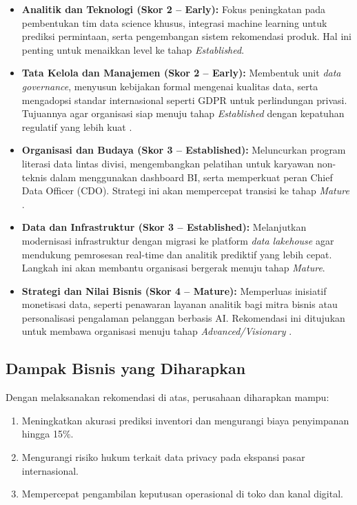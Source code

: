 \begin{itemize}
	\item \textbf{Analitik dan Teknologi (Skor 2 – Early):}  
	Fokus peningkatan pada pembentukan tim data science khusus, 
	integrasi machine learning untuk prediksi permintaan, serta 
	pengembangan sistem rekomendasi produk.  
	Hal ini penting untuk menaikkan level ke tahap \textit{Established}.
	
	\item \textbf{Tata Kelola dan Manajemen (Skor 2 – Early):}  
	Membentuk unit \textit{data governance}, menyusun kebijakan formal mengenai 
	kualitas data, serta mengadopsi standar internasional seperti GDPR untuk 
	perlindungan privasi.  
	Tujuannya agar organisasi siap menuju tahap \textit{Established} dengan 
	kepatuhan regulatif yang lebih kuat \cite{zwitter2014}.
	
	\item \textbf{Organisasi dan Budaya (Skor 3 – Established):}  
	Meluncurkan program literasi data lintas divisi, mengembangkan pelatihan 
	untuk karyawan non-teknis dalam menggunakan dashboard BI, serta memperkuat 
	peran Chief Data Officer (CDO).  
	Strategi ini akan mempercepat transisi ke tahap \textit{Mature} 
	\cite{davenport2010analytics}.
	
	\item \textbf{Data dan Infrastruktur (Skor 3 – Established):}  
	Melanjutkan modernisasi infrastruktur dengan migrasi ke platform 
	\textit{data lakehouse} agar mendukung pemrosesan real-time dan 
	analitik prediktif yang lebih cepat.  
	Langkah ini akan membantu organisasi bergerak menuju tahap \textit{Mature}.
	
	\item \textbf{Strategi dan Nilai Bisnis (Skor 4 – Mature):}  
	Memperluas inisiatif monetisasi data, seperti penawaran layanan analitik 
	bagi mitra bisnis atau personalisasi pengalaman pelanggan berbasis AI.  
	Rekomendasi ini ditujukan untuk membawa organisasi menuju tahap 
	\textit{Advanced/Visionary} \cite{liao2021business, ekambaram2021}.
\end{itemize}


\subsection*{Dampak Bisnis yang Diharapkan}
Dengan melaksanakan rekomendasi di atas, perusahaan diharapkan mampu:
\begin{enumerate}
	\item Meningkatkan akurasi prediksi inventori dan mengurangi biaya penyimpanan hingga 15\%.  
	\item Mengurangi risiko hukum terkait data privacy pada ekspansi pasar internasional.  
	\item Mempercepat pengambilan keputusan operasional di toko dan kanal digital.  
\end{enumerate}

